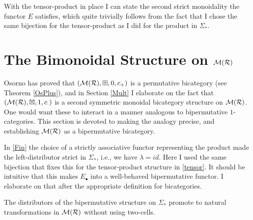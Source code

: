 With the tensor-product in place I can state the second strict 
monoidality the functor $E$ satisfies, which quite trivially follows
from the fact that I chose the same bijection for the tensor-product
as I did for the product in $\Sigma_*$.
{}

{}

\section{The Bimonoidal Structure on $\mathcal{M}(\mathcal{R})$}
Osorno has proved that $(\mathcal{M}(\mathcal{R}),\boxplus, 0, c_+)$ is a permutative
bicategory (see Theorem \ref{OsPlus}), and in Section \ref{Mult} I elaborate on the 
fact that $(\mathcal{M}(\mathcal{R}),\boxtimes, 1, c_\cdot)$ is a second symmetric monoidal
bicategory structure on $\mathcal{M}(\mathcal{R})$. One would want these to 
interact in a manner analogous to bipermutative $1$-categories. 
This section is devoted to making the analogy precise, and establishing
$\mathcal{M}(\mathcal{R})$ as a bipermutative bicategory.

In \ref{Fin} the choice of a strictly associative functor representing
the product made the left-distributor strict in $\Sigma_*$, i.e., we 
have $\lambda=id$. Here I used the same bijection that fixes this for 
the tensor-product structure in \ref{tensor}. It should be intuitive 
that this makes $E_\bullet$ into a well-behaved bipermutative functor. I
elaborate on that after the appropriate definition for bicategories.

The distributors of the bipermutative structure on $\Sigma_*$
promote to natural transformations in $\mathcal{M}(\mathcal{R})$ without using two-cells.

{}

